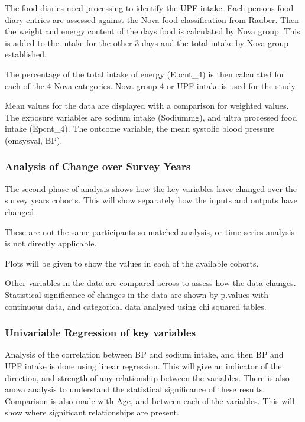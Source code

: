 \documentclass[
]{article}
\begin{document}
The food diaries need processing to identify the UPF intake. Each
persons food diary entries are assessed against the Nova food
classification from Rauber. Then the weight and energy content of the
days food is calculated by Nova group. This is added to the intake for
the other 3 days and the total intake by Nova group established.

The percentage of the total intake of energy (Epcnt\_4) is then
calculated for each of the 4 Nova categories. Nova group 4 or UPF intake
is used for the study.

Mean values for the data are displayed with a comparison for weighted
values. The exposure variables are sodium intake (Sodiummg), and ultra
processed food intake (Epcnt\_4). The outcome variable, the mean
systolic blood pressure (omsysval, BP).

\hypertarget{analysis-of-change-over-survey-years}{%
\subsubsection{Analysis of Change over Survey
Years}\label{analysis-of-change-over-survey-years}}

The second phase of analysis shows how the key variables have changed
over the survey years cohorts. This will show separately how the inputs
and outputs have changed.

These are not the same participants so matched analysis, or time series
analysis is not directly applicable.

Plots will be given to show the values in each of the available cohorts.

Other variables in the data are compared across to assess how the data
changes. Statistical significance of changes in the data are shown by
p.values with continuous data, and categorical data analysed using chi
squared tables.

\hypertarget{univariable-regression-of-key-variables}{%
\subsubsection{Univariable Regression of key
variables}\label{univariable-regression-of-key-variables}}

Analysis of the correlation between BP and sodium intake, and then BP
and UPF intake is done using linear regression. This will give an
indicator of the direction, and strength of any relationship between the
variables. There is also anova analysis to understand the statistical
significance of these results. Comparison is also made with Age, and
between each of the variables. This will show where significant
relationships are present.
\end{document}

